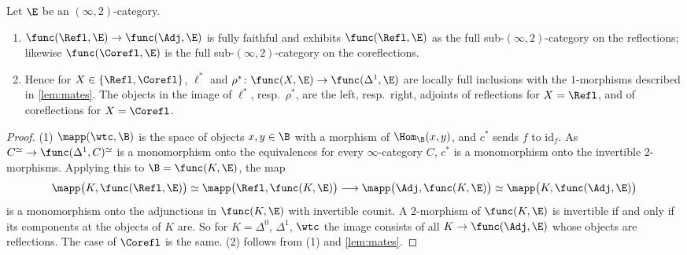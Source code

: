 \begin{lem}
\label{lem:mates-refl}
Let $\E$ be an $(\infty,2)$-category.
\begin{enumerate}
\item $\func(\Refl,\E) \to \func(\Adj,\E)$ is fully faithful and exhibits $\func(\Refl,\E)$ as the full sub-$(\infty,2)$-category on the reflections; likewise $\func(\Corefl,\E)$ is the full sub-$(\infty,2)$-category on the coreflections.
\item Hence for $X \in \{\Refl,\Corefl\}$, $\ell^{*}$ and $\rho^{*}\colon \func(X,\E) \to \func(\Delta^{1},\E)$ are locally full inclusions with the $1$-morphisms described in \cref{lem:mates}. The objects in the image of $\ell^{*}$, resp.\ $\rho^{*}$, are the left, resp.\ right, adjoints of reflections for $X = \Refl$, and of coreflections for $X = \Corefl$.
\end{enumerate}
\end{lem}

\begin{proof}
(1) $\mapp(\wtc,\B)$ is the space of objects $x,y \in \B$ with a morphism of $\Hom_{\B}(x,y)$, and $c^{*}$ sends $f$ to $\mathrm{id}_{f}$. As $C^{\simeq} \to \func(\Delta^{1},C)^{\simeq}$ is a monomorphism onto the equivalences for every $\infty$-category $C$, $c^{*}$ is a monomorphism onto the invertible $2$-morphisms.
Applying this to $\B = \func(K,\E)$, the map
\[
\mapp\bigl(K,\func(\Refl,\E)\bigr) \simeq \mapp\bigl(\Refl,\func(K,\E)\bigr) \longrightarrow \mapp\bigl(\Adj,\func(K,\E)\bigr) \simeq \mapp\bigl(K,\func(\Adj,\E)\bigr)
\]
is a monomorphism onto the adjunctions in $\func(K,\E)$ with invertible counit. A $2$-morphism of $\func(K,\E)$ is invertible if and only if its components at the objects of $K$ are.
So for $K = \Delta^{0}$, $\Delta^{1}$, $\wtc$ the image consists of all $K \to \func(\Adj,\E)$ whose objects are reflections. The case of $\Corefl$ is the same.
(2) follows from (1) and \cref{lem:mates}.
\end{proof}
